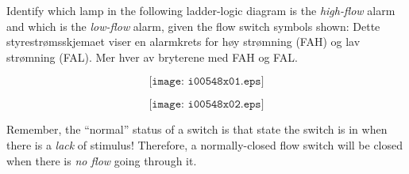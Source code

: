 

Identify which lamp in the following ladder-logic diagram is the {\it high-flow} alarm and which is the {\it low-flow} alarm, given the flow switch symbols shown:
Dette styrestrømsskjemaet viser en alarmkrets for høy strømning (FAH) og lav strømning (FAL). Mer hver av bryterene med FAH og FAL. 

$$\texttt{[image: i00548x01.eps]}$$







$$\texttt{[image: i00548x02.eps]}$$







Remember, the ``normal'' status of a switch is that state the switch is in when there is a {\it lack} of stimulus!  Therefore, a normally-closed flow switch will be closed when there is {\it no flow} going through it.




